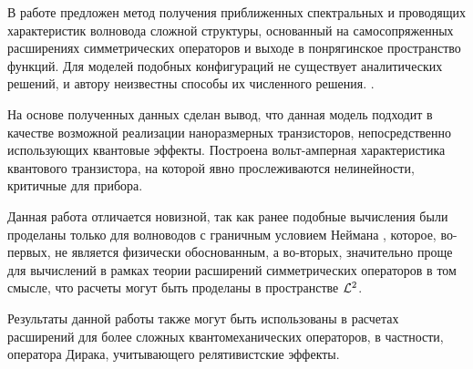 \startconclusionpage

В работе предложен метод получения приближенных спектральных и проводящих характеристик волновода сложной структуры, основанный на самосопряженных расширениях симметрических операторов и выходе в понрягинское пространство функций. Для моделей подобных конфигураций не существует аналитических решений, и автору неизвестны способы их численного решения. .

На основе полученных данных сделан вывод, что данная модель подходит в качестве возможной реализации наноразмерных транзисторов, непосредственно использующих квантовые эффекты. Построена вольт-амперная характеристика квантового транзистора, на которой явно прослеживаются нелинейности, критичные для прибора.

Данная работа отличается новизной, так как ранее подобные вычисления были проделаны только для волноводов с граничным условием Неймана \cite{popov1993zero}, которое, во-первых, не является физически обоснованным, а во-вторых, значительно проще для вычислений в рамках теории расширений симметрических операторов в том смысле, что расчеты могут быть проделаны в пространстве $\mathcal{L}^2$.

Результаты данной работы также могут быть использованы в расчетах расширений для более сложных квантомеханических операторов, в частности, оператора Дирака, учитывающего релятивистские эффекты.